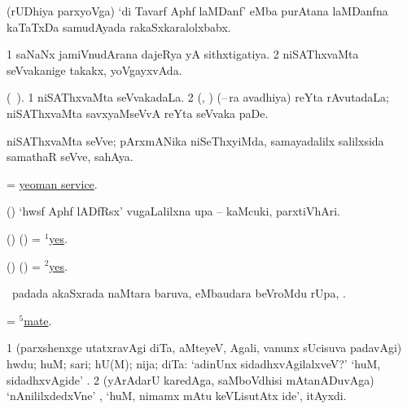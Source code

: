  (rUDhiya parxyoVga) `di  Tavarf Aphf laMDanf' eMba purAtana laMDanfna kaTaTxDa samudAyada rakaSxkaralolxbabx.
\eanum
\numie
\enum
\emng
\eentry

\bentry
{} 
\gl{\gu} 
\bmng
\bnum
\num{1} saNaNx jamiVnudArana dajeRya yA sithxtigatiya. 
\num{2} niSAThxvaMta seVvakanige takakx, yoVgayxvAda.
\enum
\emng 
\eentry

\bentry
{} 
\gl{\nA} 
\bmng
(\bava\ ).
\bnum
\num{1} niSAThxvaMta seVvakadaLa. 
\num{2} (\birx, \ca) (--\,ra avadhiya) reYta rAvutadaLa; niSAThxvaMta  savxyaMseVvA reYta seVvaka paDe.
\enum
\emng
\eentry

\bentry
{}
\gl{\nA} 
\bmng
niSAThxvaMta seVve; pArxmANika niSeThxyiMda, samayadalilx salilxsida samathaR seVve, sahAya.
\emng
\eentry

\bentry
{}
\gl{\nA} 
\bmng
= \hyperlink{yeoman service}{yeoman service}.
\emng
\eentry

\bentry
{}
\gl{\nA} 
\bmng
(\birx) `hwsf Aphf lADfRsx'  \mo vugaLalilxna upa -- kaMcuki, parxtiVhAri.
\emng
\eentry

\bentry
{} 
\gl{\kirxvi} 
\bmng
(\ame) (\AmA) = \hyperlink{yes(1)}{$^1$yes}.
\emng
\eentry

\bentry
{} 
\gl{\nA} 
\bmng
(\ame) (\AmA) = \hyperlink{yes(2)}{$^2$yes}.
\emng
\eentry

\bentry
{} 
\gl{\uparx} 
\bmng
\sA\ padada  akaSxrada naMtara baruva,  eMbaudara beVroMdu rUpa, \udA. 
\emng
\eentry

\bentry
{}
\gl{\nA} 
\bmng
= \hyperref{kandict_m.pdf}{M}{mate(5)}{$^5$mate}.
\emng 
\eentry

\bentry
{} 
\gl{\kirxvi} 
\bmng
\bnum
\num{1}  (parxshenxge utatxravAgi diTa, aMteyeV, Agali, \mo vanunx sUcisuva padavAgi) hwdu; huM; sari; hU(M); nija; diTa:  `adinUnx sidadhxvAgilalxveV?' `huM, sidadhxvAgide' . 
\num{2} (yArAdarU karedAga, saMboVdhisi mAtanADuvAga) `nAnililxdedxVne' , `huM, nimamx mAtu keVLisutAtx ide', itAyxdi.   
\enum
\emng

